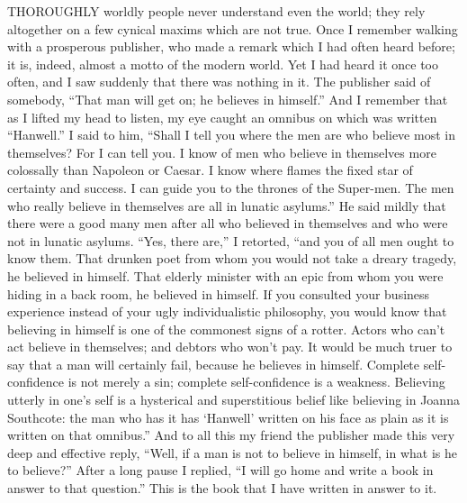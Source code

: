 THOROUGHLY worldly people never understand even the world; they rely altogether on a few cynical maxims which are not true. Once I remember walking with a prosperous publisher, who made a remark which I had often heard before; it is, indeed, almost a motto of the modern world. Yet I had heard it once too often, and I saw suddenly that there was nothing in it. The publisher said of somebody, “That man will get on; he believes in himself.” And I remember that as I lifted my head to listen, my eye caught an omnibus on which was written “Hanwell.” I said to him, “Shall I tell you where the men are who believe most in themselves? For I can tell you. I know of men who believe in themselves more colossally than Napoleon or Caesar. I know where flames the fixed star of certainty and success. I can guide you to the thrones of the Super-men. The men who really believe in themselves are all in lunatic asylums.” He said mildly that there were a good many men after all who believed in themselves and who were not in lunatic asylums. “Yes, there are,” I retorted, “and you of all men ought to know them. That drunken poet from whom you would not take a dreary tragedy, he believed in himself. That elderly minister with an epic from whom you were hiding in a back room, he believed in himself. If you consulted your business experience instead of your ugly individualistic philosophy, you would know that believing in himself is one of the commonest signs of a rotter. Actors who can’t act believe in themselves; and debtors who won’t pay. It would be much truer to say that a man will certainly fail, because he believes in himself. Complete self-confidence is not merely a sin; complete self-confidence is a weakness. Believing utterly in one’s self is a hysterical and superstitious belief like believing in Joanna Southcote: the man who has it has ‘Hanwell’ written on his face as plain as it is written on that omnibus.” And to all this my friend the publisher made this very deep and effective reply, “Well, if a man is not to believe in himself, in what is he to believe?” After a long pause I replied, “I will go home and write a book in answer to that question.” This is the book that I have written in answer to it.

